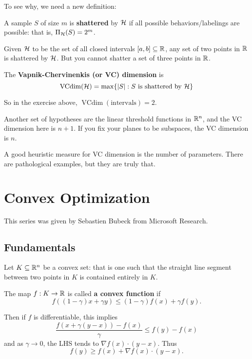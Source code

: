 \documentclass[12pt]{article}
\begin{document}
To see why, we need a new definition:
\begin{defn}
	A sample $S$ of size $m$ is \textbf{shattered} by $\mathcal{H}$ if all possible behaviors/labelings are possible: that is, $\Pi_{\mathcal{H}}(S)=2^m$.
\end{defn}
\begin{ex}
	Given $\mathcal{H}$ to be the set of all closed intervals $[a,b]\subseteq\mathbb{R}$, any set of two points in $\mathbb{R}$ is shattered by $\mathcal{H}$.
	But you cannot shatter a set of three points in $\mathbb{R}$.
\end{ex}
\begin{defn}
	The \textbf{Vapnik-Chervinenkis (or VC) dimension} is
	\[\operatorname{VCdim}(\mathcal{H})=\max\{|S|: S\text{ is shattered by }\mathcal{H}\}\]
\end{defn}
\begin{rmk}
	So in the exercise above, $\operatorname{VCdim}(\text{intervals})=2$.
\end{rmk}
Another set of hypotheses are the linear threshold functions in $\mathbb{R}^n$, and the VC dimension here is $n+1$. If you fix your planes to be subspaces, the VC dimension is $n$.

\begin{rmk}
	A good heuristic measure for VC dimension is the number of parameters. There are pathological examples, but they are truly that.
\end{rmk}



\section{Convex Optimization}
This series was given by Sebastien Bubeck from Microsoft Research.

\subsection{Fundamentals}
Let $K\subseteq \mathbb{R}^n$ be a convex set: that is one such that the straight line segment between two points in $K$ is contained entirely in $K$.
\begin{defn}
	The map $f:K\to\mathbb{R}$ is called \textbf{a convex function} if 
	\[f((1-\gamma)x+\gamma y)\le (1-\gamma)f(x)+\gamma f(y).\]
\end{defn}
\begin{rmk}
	Then if $f$ is differentiable, this implies
	\[\frac{f(x+\gamma(y-x))-f(x)}{\gamma}\le f(y)-f(x)\]
	and as $\gamma\to 0$, the LHS tends to $\nabla f(x)\cdot (y-x)$. Thus
	\[f(y)\ge f(x)+\nabla f(x)\cdot(y-x).\]
\end{rmk}
\end{document}
